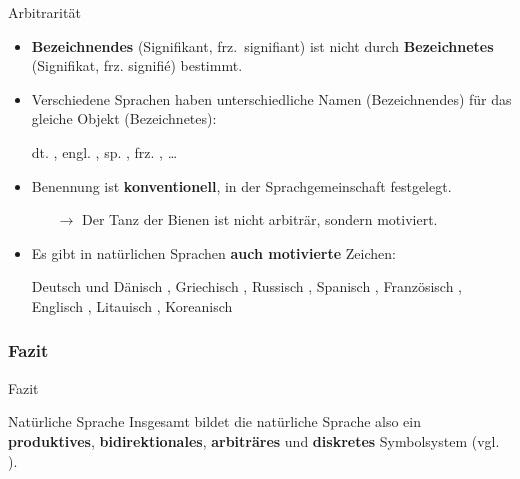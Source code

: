 \begin{frame}{Arbitrarität}

\begin{itemize}
	\item<1-> \textbf{Bezeichnendes} (Signifikant, frz.\ signifiant) ist nicht durch \textbf{Bezeichnetes} (Signifikat, frz. signifié) bestimmt.
	\item[]
	\item<2-> Verschiedene Sprachen haben unterschiedliche Namen (Bezeichnendes) für das gleiche Objekt (Bezeichnetes):

\pause

\ea dt. , engl. , sp. , frz. , \ldots
\z

\pause 

	\item Benennung ist \textbf{konventionell}, \dash in der Sprachgemeinschaft festgelegt.

	\begin{itemize}
		\item[$\rightarrow$] Der Tanz der Bienen ist nicht arbiträr, sondern motiviert.
	\end{itemize}

\pause
		
	\item Es gibt in natürlichen Sprachen \textbf{auch motivierte} Zeichen:

\ea Deutsch und Dänisch , Griechisch , Russisch , Spanisch , Französisch , Englisch , Litauisch , Koreanisch 
\z

\end{itemize}

\end{frame}


\subsubsection{Fazit}
\begin{frame}{Fazit}
		
	\begin{block}{Natürliche Sprache}
			Insgesamt bildet die natürliche Sprache also ein \textbf{produktives}, \textbf{bidirektionales}, \textbf{arbiträres} und \textbf{diskretes} Symbolsystem (vgl. \citealp{Luedeling2009a}).
	\end{block}

\end{frame}	

